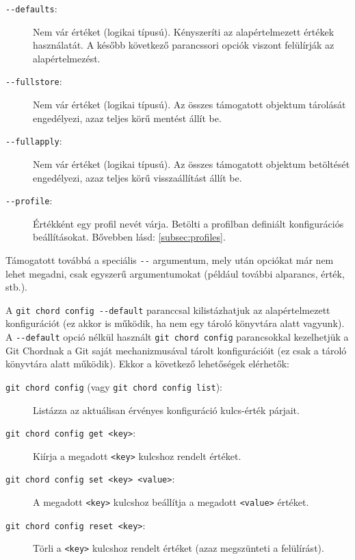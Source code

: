 \documentclass[
]{elteikthesis}[2025/03/25]
\begin{document}
\begin{description}
    \item[\texttt{{-}{-}defaults}:]
        Nem vár értéket (logikai típusú).
        Kényszeríti az alapértelmezett értékek használatát.
        A később következő parancssori opciók viszont felülírják az alapértelmezést.
    \item[\texttt{{-}{-}fullstore}:]
        Nem vár értéket (logikai típusú).
        Az összes támogatott objektum tárolását engedélyezi, azaz teljes körű mentést állít be.
    \item[\texttt{{-}{-}fullapply}:]
        Nem vár értéket (logikai típusú).
        Az összes támogatott objektum betöltését engedélyezi, azaz teljes körű visszaállítást állít be.
    \item[\texttt{{-}{-}profile}:]
        Értékként egy profil nevét várja.
        Betölti a profilban definiált konfigurációs beállításokat.
        Bővebben lásd: \ref{subsec:profiles}.
\end{description}

Támogatott továbbá a speciális \verb|--| argumentum, mely után opciókat már nem lehet megadni, csak egyszerű argumentumokat (például további alparancs, érték, stb.).

A \verb|git chord config --default| paranccsal kilistázhatjuk az alapértelmezett konfigurációt
(ez akkor is működik, ha nem egy tároló könyvtára alatt vagyunk).
A \verb|--default| opció nélkül használt \verb|git chord config| parancsokkal kezelhetjük a Git Chordnak a Git saját mechanizmusával tárolt konfigurációit
(ez csak a tároló könyvtára alatt működik).
Ekkor a következő lehetőségek elérhetők:

\begin{description}
    \item[\texttt{git chord config} (vagy \texttt{git chord config list}):]
        Listázza az aktuálisan érvényes konfiguráció kulcs-érték párjait.
    \item[\texttt{git chord config get <key>}:]
        Kiírja a megadott \verb|<key>| kulcshoz rendelt értéket.
    \item[\texttt{git chord config set <key> <value>}:]
        A megadott \verb|<key>| kulcshoz beállítja a megadott \verb|<value>| értéket.
    \item[\texttt{git chord config reset <key>}:]
        Törli a \verb|<key>| kulcshoz rendelt értéket (azaz megszünteti a felülírást).
\end{description}
\end{document}
